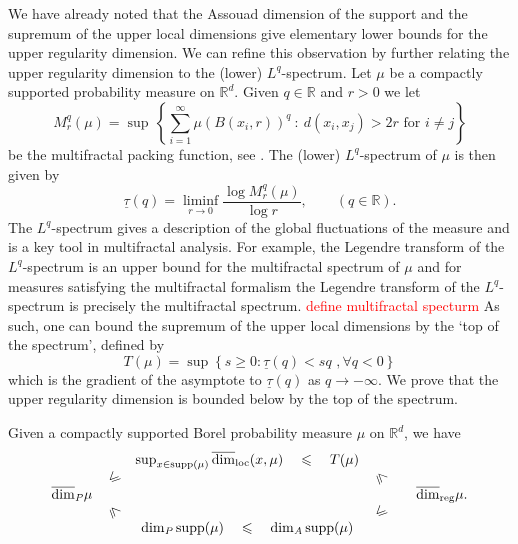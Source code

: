 We have already noted that the Assouad dimension of the support and the supremum of the upper local dimensions give elementary lower bounds for the upper regularity dimension.  We can refine this observation by further relating the upper regularity dimension to the (lower) $L^q$-spectrum.  Let $\mu$ be a compactly supported probability measure on $\mathbb{R}^d$.  Given $q \in \mathbb{R}$ and $r>0$ we let
\[
M_r^q(\mu) = \sup  \, \left \{ \sum_{i=1}^\infty  \mu(B(x_i,r))^q \ : \ d(x_i, x_j) > 2r \text{ for $i \neq j$} \right\}
\]
be the multifractal packing function, see \cite{olsenformalism}.  The  (lower) $L^q$-spectrum of $\mu$ is then given by
\[
\underline{\tau}(q)= \liminf_{r\rightarrow 0} \frac{\log M_r^q(\mu) }{\log r}, \qquad (q\in \mathbb{R}).
\]
The $L^q$-spectrum gives a description of the global fluctuations of the measure and is a key tool in multifractal analysis. For example, the Legendre transform of the $L^q$-spectrum is an upper bound for the multifractal spectrum of $\mu$ and for measures satisfying the multifractal formalism the Legendre transform of the $L^q$-spectrum is precisely the multifractal spectrum. \textcolor{red}{define multifractal specturm}  As such, one can bound the supremum of the upper local dimensions by the `top of the spectrum', defined by
\[
T(\mu)=\sup \left\{ s \ge 0 \colon \underline{\tau}(q) < sq \, \,, \forall q<0 \right\}
\]
which is the gradient of the asymptote to $\underline{\tau}(q)$ as $q \rightarrow - \infty$.  We prove that the upper regularity dimension is bounded below by the top of the spectrum.  


\begin{theorem} \label{ch-upper-reg:relationships}
	Given a compactly supported Borel probability measure $\mu$ on $\mathbb{R}^d$, we have
	\[
	\begin{array}{ccccccccccc}
	&&                  \sup_ {x\in \mathrm{supp}(\mu)}  \overline{\dim}_{\mathrm{loc}}(x,\mu)   \quad  \leq    \quad   T(\mu)                        & & &    \\
	&                       \rotatebox[origin=c]{45}{$\leq$}          & &              \rotatebox[origin=c]{315}{$\leq$} & &   \\
	\overline{\dim}_\text{\emph{P}} \mu                                            & &        &&                  & \r.\\
	&                \rotatebox[origin=c]{315}{$\leq$}              &&           \rotatebox[origin=c]{45}{$\leq$} & &  \\
	&&                                            \dim_\text{\emph{P}} \mathrm{supp}(\mu)      \quad  \leq   \quad  \dim_\text{\emph{A}} \mathrm{supp}(\mu)                           & & &  
	\end{array}
	\]
\end{theorem}

